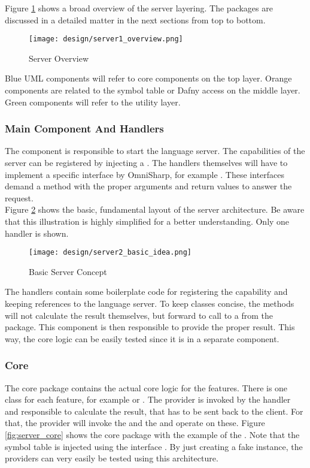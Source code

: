 Figure \ref{fig:server_overview} shows a broad overview of the server layering.
The packages are discussed in a detailed matter in the next sections from top to bottom.

\begin{figure}[H]
    \centering
    \texttt{[image: design/server1\_overview.png]}
    \caption{Server Overview}
    \label{fig:server_overview}
\end{figure}
Blue UML components will refer to core components on the top layer.
Orange components are related to the symbol table or Dafny access on the middle layer.
Green components will refer to the utility layer.


\subsubsection{Main Component And Handlers}
The  component is responsible to start the language server.
The capabilities of the server can be registered by injecting a .
The handlers themselves will have to implement a specific interface by OmniSharp, for example .
These interfaces demand a  method with the proper arguments and return values to answer the request.\\

Figure \ref{fig:server_basic_idea} shows the basic, fundamental layout of the server architecture.
Be aware that this illustration is highly simplified for a better understanding.
Only one handler is shown.\\

\begin{figure}[H]
    \centering
    \texttt{[image: design/server2\_basic\_idea.png]}
    \caption{Basic Server Concept}
    \label{fig:server_basic_idea}
\end{figure}

The handlers contain some boilerplate code for registering the capability and keeping references to the language server.
To keep classes concise, the  methods will not calculate the result themselves, but forward to call to a  from the  package.
This component is then responsible to provide the proper result.
This way, the core logic can be easily tested since it is in a separate component.\\

\subsubsection {Core}
The core package contains the actual core logic for the features.
There is one class for each feature, for example  or .
The provider is invoked by the handler and responsible to calculate the result, that has to be sent back to the client.
For that, the provider will invoke the  and the  and operate on these.
Figure \ref{fig:server_core} shows the core package with the example of the .
Note that the symbol table is injected using the interface .
By just creating a fake instance, the providers can very easily be tested using this architecture.

